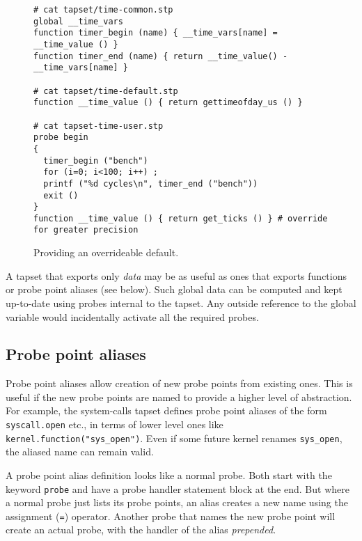\documentclass{article}
\newenvironment{boxedminipage}%
    {\begin{makeimage}\begin{center}\begin{Sbox}\begin{minipage}}%
    {\end{minipage}\end{Sbox}\fbox{\TheSbox}\end{center}\end{makeimage}}
\renewcommand{\nomenclature}[2]{}
\begin{document}
\begin{figure}[!ht]
\begin{boxedminipage}{6in}
\begin{verbatim}
# cat tapset/time-common.stp
global __time_vars
function timer_begin (name) { __time_vars[name] = __time_value () }
function timer_end (name) { return __time_value() - __time_vars[name] }

# cat tapset/time-default.stp
function __time_value () { return gettimeofday_us () }

# cat tapset-time-user.stp
probe begin
{
  timer_begin ("bench")
  for (i=0; i<100; i++) ; 
  printf ("%d cycles\n", timer_end ("bench"))
  exit ()
}
function __time_value () { return get_ticks () } # override for greater precision

\end{verbatim}
\end{boxedminipage}
\caption{Providing an overrideable default.}
\label{fig:tapset-default}
\end{figure}

A tapset that exports only {\em data} may be as useful as ones that
exports functions or probe point aliases (see below).  Such global
data can be computed and kept up-to-date using probes internal to the
tapset.  Any outside reference to the global variable would
incidentally activate all the required probes.

\subsection{Probe point aliases}

\nomenclature{probe point alias}{A probe point that is defined in
terms of another probe point.}  Probe point aliases allow creation of
new probe points from existing ones.  This is useful if the new probe
points are named to provide a higher level of abstraction.  For
example, the system-calls tapset defines probe point aliases of the
form \verb+syscall.open+ etc., in terms of lower level ones like
\verb+kernel.function("sys_open")+.  Even if some future kernel
renames \verb+sys_open+, the aliased name can remain valid.

A probe point alias definition looks like a normal probe.  Both start
with the keyword \verb+probe+ and have a probe handler statement block
at the end.  But where a normal probe just lists its probe points, an
alias creates a new name using the assignment (\verb+=+) operator.
Another probe that names the new probe point will create an actual
probe, with the handler of the alias {\em prepended}.
\end{document}
